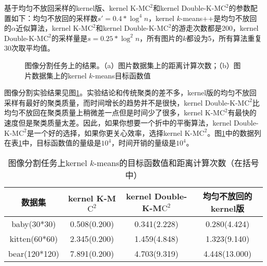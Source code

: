 基于均匀不放回采样的kernel版、kernel K-M$\text{C}^2$和kernel Double-K-M$\text{C}^2$的参数配置如下：均匀不放回的采样数$s' = 0.4*\log^4 n$，kernel $k$-means++是均匀不放回的$\alpha$近似算法，kernel K-M$\text{C}^2$和kernel Double-K-M$\text{C}^2$的游走次数都是200，kernel Double-K-M$\text{C}^2$的采样量是$s = 0.25*\log^2 n$，所有图片的$k$都设为5，所有算法重复30次取平均值。

\begin{figure}[h]
    \caption{图像分割任务上的结果。（a）图片数据集上的距离计算次数；（b）图片数据集上的kernel $k$-means目标函数值}
    \label{fig: image running time & ncut}
\end{figure}

图像分割实验结果见图\ref{fig: image running time & ncut}。实验结论和传统聚类的差不多，kernel版的均匀不放回采样有最好的聚类质量，而时间增长的趋势并不是很快，kernel Double-K-M$\text{C}^2$比均匀不放回在聚类质量上稍微差一点但是时间少了很多，kernel K-M$\text{C}^2$有最快的速度但是聚类质量太差。因此，如果你想要一个折中的平衡算法，kernel Double-K-M$\text{C}^2$是一个好的选择，如果你更关心效率，选择kernel K-M$\text{C}^2$。图\ref{fig: image running time & ncut}中的数据列在表\ref{tab:results on image segmentation}中，目标函数值的量级是$10^4$，时间开销的量级是$10^4$。
\begin{table}[h]
	\caption{图像分割任务上kernel $k$-means的目标函数值和距离计算次数（在括号中）}
	\label{tab:results on image segmentation}
	\scriptsize
	\begin{tabular}{cccc}
		\toprule
		数据集 & kernel K-M$\text{C}^2$ & kernel Double-K-M$\text{C}^2$ & 均匀不放回的kernel版 \\
		\midrule
		baby(30*30) & 0.508(0.200) & 0.341(2.228) & 0.280(4.424) \\
		kitten(60*60) & 2.345(0.200) & 1.459(4.848) & 1.323(9.140) \\
		bear(120*120) & 7.891(0.200) & 4.703(9.319) & 4.448(13.000) \\
		\bottomrule
	\end{tabular}
\end{table}
